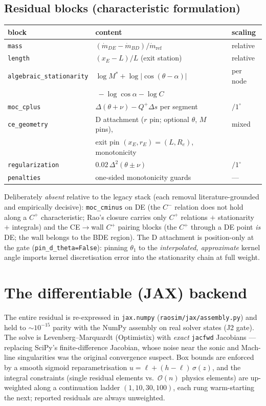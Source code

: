 \documentclass[11pt]{article}
\begin{document}
\subsection{Residual blocks (characteristic formulation)}
\begin{center}
\begin{tabular}{lll}
\toprule
block & content & scaling \\
\midrule
\texttt{mass} & $(\dot m_{DE}-\dot m_{BD})/\dot m_{\mathrm{ref}}$ & relative \\
\texttt{length} & $(x_E - L)/L$ \quad (exit station) & relative \\
\texttt{algebraic\_stationarity} & $\log M^* + \log|\cos(\theta-\alpha)|$ & per node \\
 & $\ -\log\cos\alpha-\log C$ & \\
\texttt{moc\_cplus} & $\Delta(\theta+\nu) - Q^{+}\Delta s$ per segment & $/1^\circ$ \\
\texttt{ce\_geometry} & D attachment ($r$ pin; optional $\theta$, $M$ pins), & mixed \\
 & exit pin $(x_E,r_E)=(L,R_e)$, monotonicity & \\
\texttt{regularization} & $0.02\,\Delta^2(\theta\pm\nu)$ & $/1^\circ$ \\
\texttt{penalties} & one-sided monotonicity guards & --- \\
\bottomrule
\end{tabular}
\end{center}
Deliberately \emph{absent} relative to the legacy stack (each removal
literature-grounded and empirically decisive):
\texttt{moc\_cminus} on DE (the $C^{-}$ relation does not hold along a
$C^{+}$ characteristic; Rao's closure carries only $C^{+}$ relations
$+$ stationarity $+$ integrals) and the CE$\to$wall $C^{+}$ pairing
blocks (the $C^{+}$ through a DE point \emph{is} DE; the wall belongs
to the BDE region).  The D attachment is position-only at the gate
(\texttt{pin\_d\_theta=False}): pinning $\theta_1$ to the
\emph{interpolated, approximate} kernel angle imports kernel
discretisation error into the stationarity chain at full weight.

\section{The differentiable (JAX) backend}
The entire residual is re-expressed in \texttt{jax.numpy}
(\texttt{raosim/jax/assembly.py}) and held to $\sim10^{-15}$ parity with
the NumPy assembly on real solver states (J2 gate).  The solve is
Levenberg--Marquardt (Optimistix) with \emph{exact} \texttt{jacfwd}
Jacobians --- replacing SciPy's finite-difference Jacobian, whose noise
near the sonic and Mach-line singularities was the original convergence
suspect.  Box bounds are enforced by a smooth sigmoid reparametrisation
$u = \ell + (h-\ell)\,\sigma(z)$, and the integral constraints
(single residual elements vs.\ $\mathcal{O}(n)$ physics elements) are
up-weighted along a continuation ladder $(1,10,30,100)$, each rung
warm-starting the next; reported residuals are always unweighted.
\end{document}
